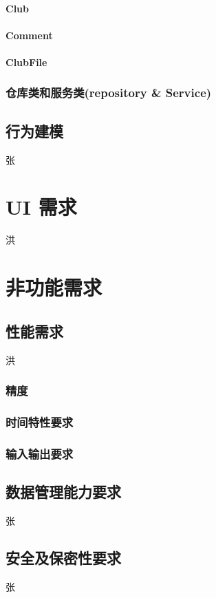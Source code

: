 \documentclass[UTF8]{ctexart}
\begin{document}
\paragraph{Club}
\paragraph{Comment}
\paragraph{ClubFile}
\subsubsection{仓库类和服务类(repository \& Service)}
\subsection{行为建模}
张

\section{UI 需求}
洪

\section{非功能需求}
\subsection{性能需求}
洪
\subsubsection{精度}

\subsubsection{时间特性要求}

\subsubsection{输入输出要求}

\subsection{数据管理能力要求}
张
\subsection{安全及保密性要求}
张
\end{document}
